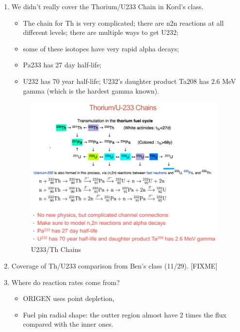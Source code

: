 \documentclass{school-22.211-notes}
\begin{document}
\clearpage
{}
\begin{enumerate}
 \item We didn't really cover the Thorium/U233 Chain in Kord's class. 
   \begin{itemize}
   \item The chain for Th is very complicated; there are n2n reactions at all different levels; there are multiple ways to get U232; 
   \item some of these isotopes have very rapid alpha decays; 
   \item Pa233 has 27 day half-life; 
   \item U232 has 70 year half-life; U232's daughter product Ta208 has 2.6 MeV gamma (which is the hardest gamma known). 
   \end{itemize}
   \begin{figure}[h]
     \centering
     \includegraphics[width=4in]{images/dfs/Th-U-chains.png}
     \caption{U233/Th Chains} 
   \end{figure}


\item Coverage of Th/U233 comparison from Ben's class (11/29). [FIXME]


\item Where do reaction rates come from? 
  \begin{itemize}
  \item ORIGEN uses point depletion, 
  \item Fuel pin radial shape: the outter region almost have 2 times the flux compared with the inner ones. 
  \end{itemize}


\end{enumerate}
\end{document}
